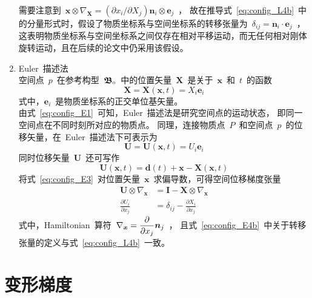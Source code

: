 \begin{enumerate}
需要注意到~$\bm{x} \otimes \nabla_{\bm{X}}=(\partial x_i \big/ \partial X_j)\bm{n}_i \otimes \bm{e}_j$~，
故在推导式~\eqref{eq:config_L4b}~中的分量形式时，假设了物质坐标系与空间坐标系的转移张量为~$\delta_{ij}=\bm{n}_i \cdot \bm{e}_j$~，
这表明物质坐标系与空间坐标系之间仅存在相对平移运动，而无任何相对刚体旋转运动，且在后续的论文中仍采用该假设。
\item Euler~描述法\\
空间点~$p$~在参考构型~$\bm{\mathfrak{B}}_{\scriptscriptstyle 0}$~中的位置矢量~$\bm{X}$~是关于~$\bm{x}$~和~$t$~的函数
\begin{equation}\label{eq:config_E1}
	\bm{X}=\bm{X}(\bm{x},t)=X_i\bm{e}_i
\end{equation}
式中，$\bm{e}_i$~是物质坐标系的正交单位基矢量。\\
由式~\eqref{eq:config_E1}~可知，Euler~描述法是研究空间点的运动状态，
即同一空间点在不同时刻所对应的物质点。
同理，连接物质点~$P$~和空间点~$p$~的位移矢量，在~Euler~描述法下可表示为
\begin{equation}\label{eq:config_E2}
	\bm{U}=\bm{U}(\bm{x},t)=U_i\bm{e}_i
\end{equation}
同时位移矢量~$\bm{U}$~还可写作
\begin{equation}\label{eq:config_E3}
	\bm{U}(\bm{x},t)=\bm{d}(t)+\bm{x}-\bm{X}(\bm{x},t)
\end{equation}
将式~\eqref{eq:config_E3}~对位置矢量~$\bm{x}$~求偏导数，可得空间位移梯度张量
{\setlength\belowdisplayskip{5pt}
\begin{subequations}\label{eq:config_E4}
	\begin{align}
	\bm{U} \otimes \nabla_{\bm{x}} & =\bm{I}-\bm{X} \otimes \nabla_{\bm{x}} \label{eq:config_E4a} \\[1pt]
	\frac{\partial U_i}{\partial x_j} & =\delta_{ij}-\frac{\partial X_i}{\partial x_j} \label{eq:config_E4b}
	\end{align}
\end{subequations}}
式中，Hamiltonian~算符~$\nabla_{\bm{x}}={\displaystyle\frac{\partial}{\partial x_j}} \bm{n}_j$~，
且式~\eqref{eq:config_E4b}~中关于转移张量的定义与式~\eqref{eq:config_L4b}~一致。
\end{enumerate}

\section{变形梯度}

